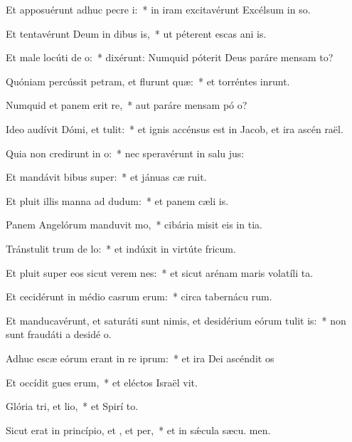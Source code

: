 \item Et apposuérunt adhuc pecre i:~* in iram excitavérunt Excélsum in so.
\item Et tentavérunt Deum in dibus is,~* ut péterent escas ani is.
\item Et male locúti  de o:~* dixérunt: Numquid póterit Deus paráre mensam  to?
\item Quóniam percússit petram, et flurunt quæ:~* et torréntes inrunt.
\item Numquid et panem erit re,~* aut paráre mensam pó o?
\item Ideo audívit Dómi, et tulit:~* et ignis accénsus est in Jacob, et ira ascén  raël.
\item Quia non credirunt in o:~* nec speravérunt in salu jus:
\item Et mandávit bibus super:~* et jánuas cæ ruit.
\item Et pluit illis manna ad dudum:~* et panem cæli  is.
\item Panem Angelórum manduvit mo,~* cibária misit eis in tia.
\item Tránstulit trum de lo:~* et indúxit in virtúte  fricum.
\item Et pluit super eos sicut verem nes:~* et sicut arénam maris volatíli ta.
\item Et cecidérunt in médio casrum erum:~* circa tabernácu rum.
\item Et manducavérunt, et saturáti sunt nimis, et desidérium eórum tulit is:~* non sunt fraudáti a desidé o.
\item Adhuc escæ eórum erant in re iprum:~* et ira Dei ascéndit  os
\item Et occídit gues erum,~* et eléctos Israël vit.
\item Glória tri, et lio,~* et Spirí to.
\item Sicut erat in princípio, et , et per,~* et in sǽcula sæcu. men.
